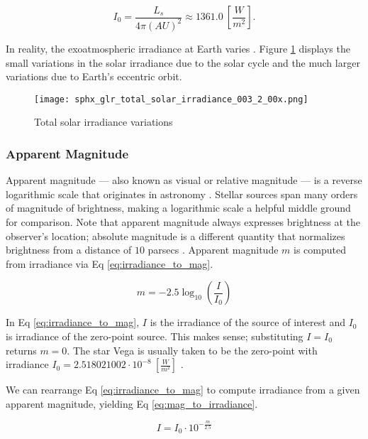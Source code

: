 \begin{equation} \label{eq:solar_constant_mean}
  I_0 = \frac{L_s}{4\pi \left(AU\right)^2} \approx 1361.0 \: \left[ \frac{W}{m^2} \right].
\end{equation}

In reality, the exoatmospheric irradiance at Earth varies \cite{frueh2019notes}. Figure \ref{fig:tsi} displays the small variations in the solar irradiance due to the solar cycle and the much larger variations due to Earth's eccentric orbit.

\begin{figure}[ht]
  \centering
  \texttt{[image: sphx\_glr\_total\_solar\_irradiance\_003\_2\_00x.png]}
  \caption{Total solar irradiance variations}
  \label{fig:tsi}
\end{figure}

\subsubsection{Apparent Magnitude}

Apparent magnitude ---  also known as visual or relative magnitude --- is a reverse logarithmic scale
that originates in astronomy \cite{frueh2019notes}. Stellar sources span many orders of magnitude of brightness, making a
logarithmic scale a helpful middle ground for comparison. Note that apparent magnitude always
expresses brightness at the observer's location; absolute magnitude is a different quantity that
normalizes brightness from a distance of $10$ parsecs \cite{frueh2019notes}. Apparent magnitude $m$
is computed from irradiance via Eq \ref{eq:irradiance_to_mag}.

\begin{equation} \label{eq:irradiance_to_mag}
  m = -2.5 \log_{10}\left( \frac{I}{I_0} \right)
\end{equation}

In Eq \ref{eq:irradiance_to_mag}, $I$ is the irradiance of the source of interest and $I_0$ is
irradiance of the zero-point source. This makes sense; substituting $I = I_0$ returns
$m=0$. The star Vega is usually taken to be the zero-point with irradiance $I_0 = 2.518021002\cdot
10^{-8} \: \left[ \frac{W}{m^2} \right]$ \cite{frueh2019notes}.

We can rearrange Eq \ref{eq:irradiance_to_mag} to compute irradiance from a given apparent magnitude,
yielding Eq \ref{eq:mag_to_irradiance}.

\begin{equation} \label{eq:mag_to_irradiance}
  I = I_0 \cdot 10^{-\frac{m}{2.5}}
\end{equation}


